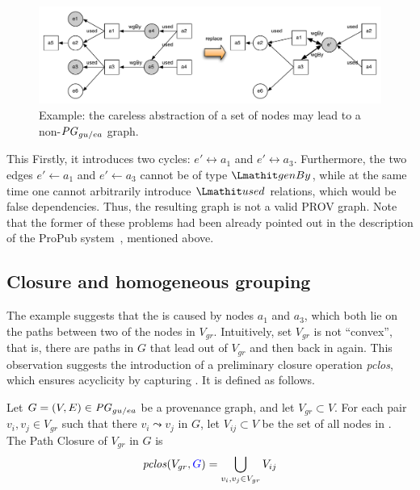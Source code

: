 \begin{figure}
\centering
\includegraphics[scale=.5]{figures/non-convex-ex-1.pdf} 
\caption{Example: the careless abstraction of a set of nodes may lead to a non-$\mathit{PG}_{gu/ea}$ graph.} \label{fig:non-convex-ex-1}
\end{figure}

This  Firstly, it introduces two cycles: $e'  \leftrightarrow a_1$ and $e'  \leftrightarrow a_3$. Furthermore, the two edges 
$e'  \leftarrow a_1$ and $e'  \leftarrow a_3$ cannot be of type $\wgby$, while at the same time one cannot arbitrarily introduce $\used$ relations, which would be false dependencies.
Thus, the resulting graph is not a valid PROV graph. Note that the former of these problems had been already pointed out in the description of the ProPub system~\citep{springerlink:10.1007/978-3-642-22351-8_13}, mentioned above.

\subsection{Closure and homogeneous grouping}
\label{sec:closure}

The example suggests that the  is caused by nodes $a_1$ and $a_3$, which both lie on the paths between two of the nodes in $V_{gr}$. Intuitively, set $V_{gr}$ is not ``convex'', that is, there are paths in $G$ that lead out of $V_{gr}$ and then back in again. This observation suggests the introduction of a preliminary closure operation \textit{pclos}, which ensures acyclicity by capturing . It is defined as follows.

\vspace*{10pt}
\begin{definition}
\label{def:clos}
Let $G = (V,E) \in \mathit{PG}_{gu/ea}$ be a provenance graph, and let $V_{gr} \subset V$.  
For each pair  $v_i, v_j \in V_{gr}$ such that there  $v_i \leadsto v_j$ in $G$, let $V_{ij} \subset V$ be the set of all nodes in .
The Path Closure of $V_{gr}$ in $G$ is
\[\clos(V_{gr}, \jwb{G})  =  \bigcup_{v_i, v_j \in V_{gr}} V_{ij} \]
\end{definition}

